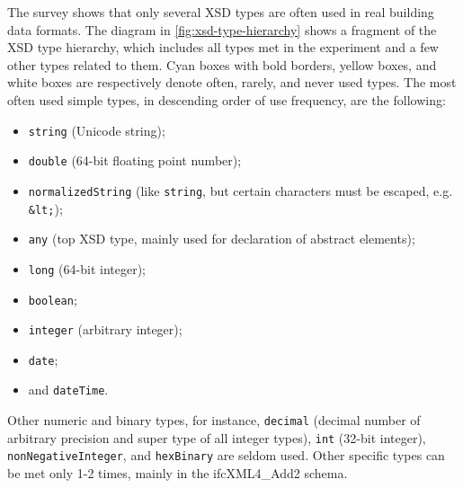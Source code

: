 The survey shows that only several XSD types are often used in real building data formats.
The diagram in \autoref{fig:xsd-type-hierarchy} shows a fragment of the XSD type hierarchy, which includes all types met in the experiment and a few other types related to them.
Cyan boxes with bold borders, yellow boxes, and white boxes are respectively denote often, rarely, and never used types.
The most often used simple types, in descending order of use frequency, are the following:
\begin{itemize}
    \item \texttt{string} (Unicode string);
    \item \texttt{double} (64-bit floating point number);
    \item \texttt{normalizedString} (like \texttt{string}, but certain characters must be escaped, e.g. \texttt{\&lt;});
    \item \texttt{any} (top XSD type, mainly used for declaration of abstract elements);
    \item \texttt{long} (64-bit integer);
    \item \texttt{boolean};
    \item \texttt{integer} (arbitrary integer);
    \item \texttt{date};
    \item and \texttt{dateTime}.
\end{itemize}
Other numeric and binary types, for instance, \texttt{decimal} (decimal number of arbitrary precision and super type of all integer types), \texttt{int} (32-bit integer), \texttt{nonNegativeInteger}, and \texttt{hexBinary} are seldom used.
Other specific types can be met only 1-2 times, mainly in the ifcXML4\_Add2 schema.


